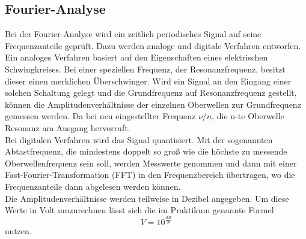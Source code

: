 \subsection{Fourier-Analyse}
Bei der Fourier-Analyse wird ein zeitlich periodisches Signal auf seine
Frequenzanteile geprüft. Dazu werden analoge und digitale Verfahren entworfen.
Ein analoges Verfahren basiert auf den Eigenschaften eines elektrischen
Schwingkreises. Bei einer speziellen Frequenz, der Resonanzfrequenz, besitzt
dieser einen merklichen Überschwinger. Wird ein Signal an den Eingang einer
solchen Schaltung gelegt und die Grundfrequenz auf Resonanzfrequenz gestellt,
können die Amplitudenverhältnisse der einzelnen Oberwellen zur Grundfrequenz
gemessen werden. Da bei neu eingestellter Frequenz $\nu/n$, die n-te Oberwelle
Resonanz am Ausgang hervorruft.\\

\noindent Bei digitalen Verfahren wird das Signal quantisiert. Mit der sogenannten
Abtastfrequenz, die mindestens doppelt so groß wie die höchste zu messende Oberwellenfrequenz sein soll,
werden Messwerte genommen und dann mit einer Fast-Fourier-Transformation (FFT) in den
Frequenzbereich übertragen, wo die Frequenzanteile dann abgelesen werden können.\\

\noindent Die Amplitudenverhältnisse werden teilweise in Dezibel angegeben. Um diese Werte in Volt umzurechnen lässt sich die im Praktikum genannte Formel
\begin{equation}
  V=10^{\frac{dB}{20}}
\end{equation}
nutzen.